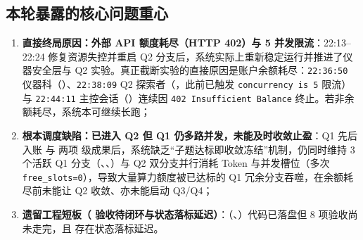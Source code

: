 \documentclass[11pt,a4paper]{ctexart}
\theoremstyle{remark}
\begin{document}
\subsection{本轮暴露的核心问题重心}
\begin{enumerate}
    \item \textbf{直接终局原因：外部 API 额度耗尽（HTTP 402）与 5 并发限流}：22:13--22:24 修复资源失控并重启 Q2 分支后，系统实际上重新稳定运行并推进了仪器安全层与 Q2 实验。真正截断实验的直接原因是账户余额耗尽：\texttt{22:36:50} 仪器科（）、\texttt{22:38:09} Q2 探索者（，此前已触发 \texttt{concurrency is 5} 限流）与 \texttt{22:44:11} 主控会话（）连续因 \texttt{402 Insufficient Balance} 终止。若非余额耗尽，系统本可继续长跑；
    \item \textbf{根本调度缺陷：已进入 Q2 但 Q1 仍多路并发，未能及时收敛止盈}：Q1 先后入账  与  两项  级成果后，系统缺乏“子题达标即收敛冻结”机制，仍同时维持 3 个活跃 Q1 分支（、、）与 Q2 双分支并行消耗 Token 与并发槽位（多次 \texttt{free\_slots=0}），导致大量算力额度被已达标的 Q1 冗余分支吞噬，在余额耗尽前未能让 Q2 收敛、亦未能启动 Q3/Q4；
    \item \textbf{遗留工程短板（ 验收待闭环与状态落标延迟）}：（、）代码已落盘但 8 项验收尚未走完，且  存在状态落标延迟。
\end{enumerate}
\end{document}
